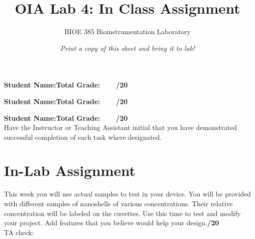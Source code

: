 \documentclass{article}
\title{OIA Lab 4: In Class Assignment}
\author{BIOE 385 Bioinstrumentation Laboratory}
\date{\textit{Print a copy of this sheet and bring it to lab!}}
\begin{document}
\large
\maketitle

\textbf{Student Name:}\hfill 	\textbf{Total Grade:\ \ \ \ /20}\vspace{0.5cm}

\textbf{Student Name:}\hfill 	\textbf{Total Grade:\ \ \ \ /20}\vspace{0.5cm}

\textbf{Student Name:}\hfill 	\textbf{Total Grade:\ \ \ \ /20}\\


Have the Instructor or Teaching Assistant initial that you have demonstrated successful completion of each task where designated.

\section*{In-Lab Assignment}
This week you will use actual samples to test in your device. You will be provided with different samples of nanoshells of various concentrations. Their relative concentration will be labeled on the cuvettes. Use this time to test and modify your project. Add features that you believe would help your design.\hfill \textbf{\underline{\hspace{1cm}}/20}\\TA check: \underline{\hspace{2cm}}
\end{document}

